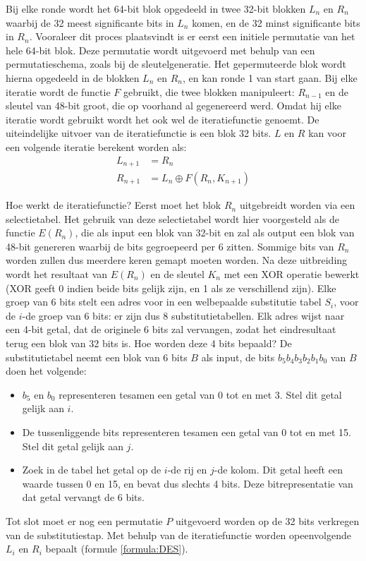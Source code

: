 \documentclass{report}
\begin{document}
	Bij elke ronde wordt het 64-bit blok opgedeeld in twee 32-bit blokken $L_n$ en $R_n$ waarbij de 32 meest significante bits in $L_n$ komen, en de 32 minst significante bits in $R_n$. Vooraleer dit proces plaatsvindt is er eerst een initiele permutatie van het hele 64-bit blok. Deze permutatie wordt uitgevoerd met behulp van een permutatieschema, zoals bij de sleutelgeneratie. Het gepermuteerde blok wordt hierna opgedeeld in de blokken $L_n$ en $R_n$, en kan ronde 1 van start gaan. Bij elke iteratie wordt de functie $F$ gebruikt, die twee blokken manipuleert: $R_{n-1}$ en de sleutel van 48-bit groot, die op voorhand al gegenereerd werd. Omdat hij elke iteratie wordt gebruikt wordt het ook wel de iteratiefunctie genoemt. De uiteindelijke uitvoer van de iteratiefunctie is een blok 32 bits. $L$ en $R$ kan voor een volgende iteratie berekent worden als:
	\begin{equation}
		\begin{split}
			L_{n + 1} & = R_{n} \\
			R_{n + 1} & = L_{n} \mathbin{\oplus} F(R_{n}, K_{n + 1})
		\end{split}
		\label{formula:DES}
	\end{equation}

	Hoe werkt de iteratiefunctie? Eerst moet het blok $R_n$ uitgebreidt worden via een selectietabel. Het gebruik van deze selectietabel wordt hier voorgesteld als de functie $E(R_n)$, die als input een blok van 32-bit en zal als output een blok van 48-bit genereren waarbij de bits gegroepeerd per 6 zitten. Sommige bits van $R_n$ worden zullen dus meerdere keren gemapt moeten worden. Na deze uitbreiding wordt het resultaat van $E(R_n)$ en de sleutel $K_n$ met een XOR operatie bewerkt (XOR geeft 0 indien beide bits gelijk zijn, en 1 als ze verschillend zijn). Elke groep van 6 bits stelt een adres voor in een welbepaalde substitutie tabel $S_i$, voor de $i$-de groep van 6 bits: er zijn dus 8 substitutietabellen. Elk adres wijst naar een 4-bit getal, dat de originele 6 bits zal vervangen, zodat het eindresultaat terug een blok van 32 bits is. Hoe worden deze 4 bits bepaald? De substitutietabel neemt een blok van 6 bits $B$ als input, de bits $b_5b_4b_3b_2b_1b_0$ van $B$ doen het volgende:
	\begin{itemize}
		\item $b_5$ en $b_0$ representeren tesamen een getal van 0 tot en met 3. Stel dit getal gelijk aan $i$. 
		\item De tussenliggende bits representeren tesamen een getal van 0 tot en met 15. Stel dit getal gelijk aan $j$.
		\item Zoek in de tabel het getal op de $i$-de rij en $j$-de kolom. Dit getal heeft een waarde tussen 0 en 15, en bevat dus slechts 4 bits. Deze bitrepresentatie van dat getal vervangt de 6 bits.
	\end{itemize}
	Tot slot moet er nog een permutatie $P$ uitgevoerd worden op de 32 bits verkregen van de substitutiestap. Met behulp van de iteratiefunctie worden opeenvolgende $L_i$ en $R_i$ bepaalt (formule \ref{formula:DES}).
\end{document}
